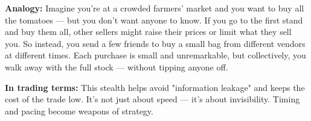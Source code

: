 \medskip

\textbf{Analogy:}
Imagine you’re at a crowded farmers’ market and you want to buy all the tomatoes — but you don’t want anyone to know. 
If you go to the first stand and buy them all, other sellers might raise their prices or limit what they sell you. 
So instead, you send a few friends to buy a small bag from different vendors at different times. Each purchase is 
small and unremarkable, but collectively, you walk away with the full stock — without tipping anyone off.

\medskip

\textbf{In trading terms:}
This stealth helps avoid "information leakage" and keeps the cost of the trade low. It's not just about speed — 
it's about invisibility. Timing and pacing become weapons of strategy.

